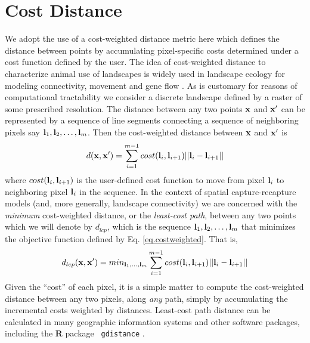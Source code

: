 \documentclass[12pt]{article}
\begin{document}
\section{Cost Distance}

We adopt the use of a cost-weighted distance metric here which
defines the
distance between points by accumulating pixel-specific costs determined under
a cost function defined by the user.
The idea of cost-weighted distance to characterize animal use of
landscapes  is widely used in
landscape ecology for modeling connectivity, movement and gene flow
\citep{adriaensen_etal:2003}. As is customary for reasons of
computational tractability we consider a discrete landscape defined by a
raster of some prescribed resolution. The distance between any two points
${\bf x}$ and ${\bf x}'$ can be represented by a sequence of line segments
connecting a sequence of neighboring  pixels say
${\bf l}_{1},{\bf l}_{2},\ldots,{\bf l}_{m}$. Then the cost-weighted distance
between ${\bf x}$ and ${\bf x}'$ is
\begin{equation}
 d({\bf x},{\bf x}')
  =  \sum_{i=1}^{m-1} cost({\bf l}_{i},{\bf l}_{i+1})||{\bf l}_{i} - {\bf l}_{i+1}||
\label{eq.costweighted}
\end{equation}
where $cost({\bf l}_{i},{\bf l}_{i+1})$ is the user-defined cost function
to move
from pixel ${\bf l}_{i}$ to neighboring pixel ${\bf l}_{i}$ in the sequence.
In the context of
spatial capture-recapture models (and, more generally, landscape
connectivity) we are concerned with the {\it minimum} cost-weighted
distance, or the {\it least-cost path}, between any two points which
we will denote by $d_{lcp}$, which is
the
sequence ${\bf l}_{1},{\bf l}_{2},\ldots,{\bf l}_{m}$ that minimizes
the objective function defined by Eq. \ref{eq.costweighted}. That is,
\begin{equation}
 d_{lcp}({\bf x},{\bf x}')
  =  min_{{\bf l}_{1},\ldots,{\bf l}_{m}}  \sum_{i=1}^{m-1} cost({\bf l}_{i},{\bf l}_{i+1})||{\bf l}_{i} - {\bf l}_{i+1}||
\label{eq.lcp}
\end{equation}
Given the ``cost'' of each pixel, it is a simple matter to compute the
cost-weighted distance between any two pixels, along {\it any} path,
simply by accumulating the incremental  costs weighted by
distances. Least-cost path distance can be calculated in
 many geographic information systems and other software packages,
including the {\bf R} package \mbox{\tt
  gdistance} \citep{vanetten:2011}.
\end{document}
